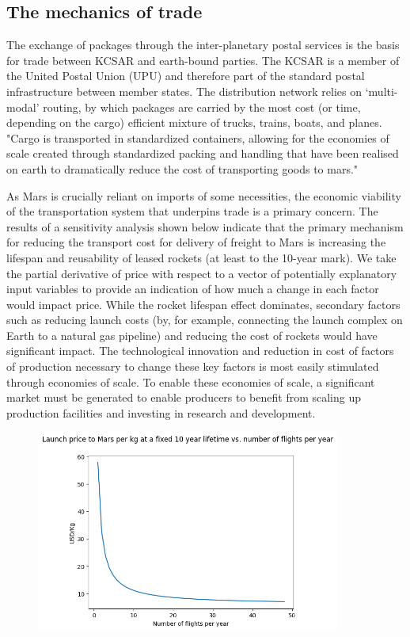 \documentclass[fleqn,10pt]{Stylesheet} %
\begin{document}
\subsection{The mechanics of trade}

The exchange of packages through the inter-planetary postal services is the basis for trade between KCSAR and earth-bound parties. The KCSAR is a member of the United Postal Union (UPU) and therefore part of the standard postal infrastructure between member states. The distribution network relies on ‘multi-modal’ routing, by which packages are carried by the most cost (or time, depending on the cargo) efficient mixture of trucks, trains, boats, and planes. "Cargo is transported in standardized containers, allowing for the economies of scale created through standardized packing and handling that have been realised on earth to dramatically reduce the cost of transporting goods to mars." \cite{Levinson}

As Mars is crucially reliant on imports of some necessities, the economic viability of the transportation system that underpins trade is a primary concern. The results of a sensitivity analysis shown below indicate that the primary mechanism for reducing the transport cost for delivery of freight to Mars is increasing the lifespan and reusability of leased rockets (at least to the 10-year mark). We take the partial derivative of price with respect to a vector of potentially explanatory input variables to provide an indication of how much a change in each factor would impact price. While the rocket lifespan effect dominates, secondary factors such as reducing launch costs (by, for example, connecting the launch complex on Earth to a natural gas pipeline) and reducing the cost of rockets would have significant impact. The technological innovation and reduction in cost of factors of production necessary to change these key factors is most easily stimulated through economies of scale. To enable these economies of scale, a significant market must be generated to enable producers to benefit from scaling up production facilities and investing in research and development.

\begin{figure}
    \centering
    \includegraphics[width=100mm]{fig_numflights.png}
    \label{fig:numflights}
\end{figure}
\end{document}
